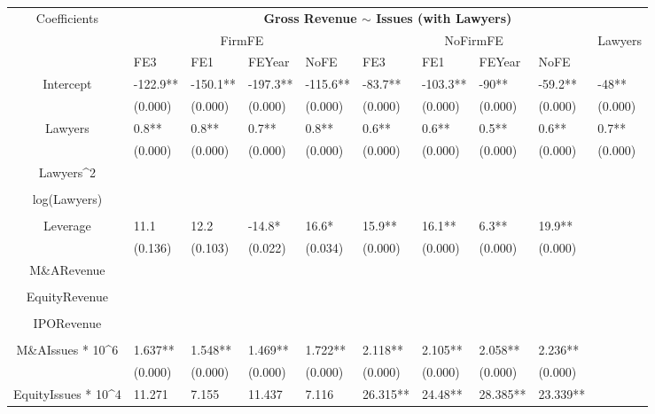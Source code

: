 \documentclass{article}
\begin{document}
\begin{table}[H]
\centering
\begin{tabular}{|clllllllll|}
\hline
\multirow{3}{*}{Coefficients} & \multicolumn{9}{c|}{\textbf{Gross Revenue $\sim$ Issues (with Lawyers)}} \\
\cline{2-10}
& \multicolumn{4}{c}{FirmFE} & \multicolumn{4}{c}{NoFirmFE} & \multirow{2}{*}{Lawyers} \\
\cline{2-9}
& FE3 & FE1 & FEYear & NoFE & FE3 & FE1 & FEYear & NoFE &  \\
\hline
 
Intercept & -122.9** & -150.1** & -197.3** & -115.6** & -83.7** & -103.3** & -90** & -59.2** & -48** \\ 
   & (0.000) & (0.000) & (0.000) & (0.000) & (0.000) & (0.000) & (0.000) & (0.000) & (0.000) \\ 
  Lawyers & 0.8** & 0.8** & 0.7** & 0.8** & 0.6** & 0.6** & 0.5** & 0.6** & 0.7** \\ 
   & (0.000) & (0.000) & (0.000) & (0.000) & (0.000) & (0.000) & (0.000) & (0.000) & (0.000) \\ 
  Lawyers^2 &  &  &  &  &  &  &  &  &  \\ 
   &  &  &  &  &  &  &  &  &  \\ 
  log(Lawyers) &  &  &  &  &  &  &  &  &  \\ 
   &  &  &  &  &  &  &  &  &  \\ 
  Leverage & 11.1 & 12.2 & -14.8* & 16.6* & 15.9** & 16.1** & 6.3** & 19.9** &  \\ 
   & (0.136) & (0.103) & (0.022) & (0.034) & (0.000) & (0.000) & (0.000) & (0.000) &  \\ 
  M\&ARevenue &  &  &  &  &  &  &  &  &  \\ 
   &  &  &  &  &  &  &  &  &  \\ 
  EquityRevenue &  &  &  &  &  &  &  &  &  \\ 
   &  &  &  &  &  &  &  &  &  \\ 
  IPORevenue &  &  &  &  &  &  &  &  &  \\ 
   &  &  &  &  &  &  &  &  &  \\ 
  M\&AIssues * 10^6 & 1.637** & 1.548** & 1.469** & 1.722** & 2.118** & 2.105** & 2.058** & 2.236** &  \\ 
   & (0.000) & (0.000) & (0.000) & (0.000) & (0.000) & (0.000) & (0.000) & (0.000) &  \\ 
  EquityIssues * 10^4 & 11.271 & 7.155 & 11.437 & 7.116 & 26.315** & 24.48** & 28.385** & 23.339** &  \\ 

\end{tabular}
\end{table}
\end{document}

